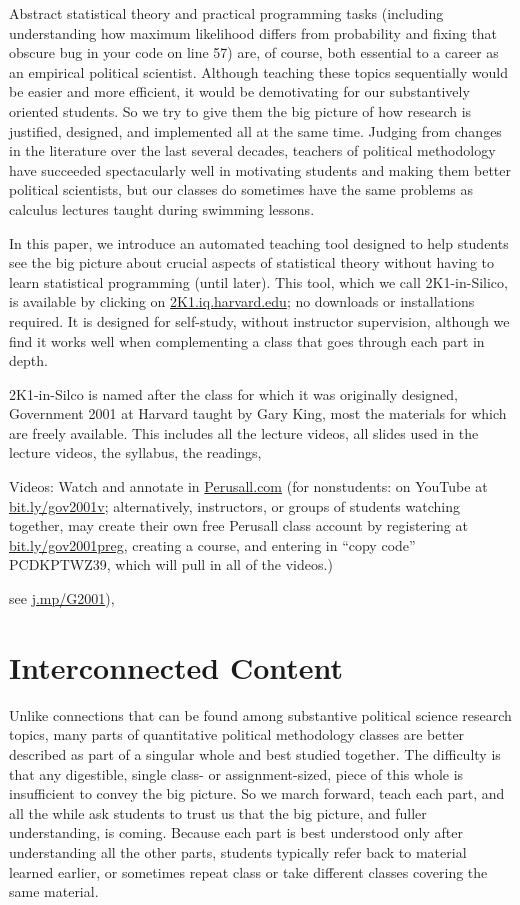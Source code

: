 \documentclass[12pt]{article}
\theoremstyle{definition}
\begin{document}
Abstract statistical theory and practical programming tasks (including understanding how maximum likelihood differs from probability and fixing that obscure bug in your code on line 57) are, of course, both essential to a career as an empirical political scientist. Although teaching these topics sequentially would be easier and more efficient, it would be demotivating for our substantively oriented students. So we try to give them the big picture of how research is justified, designed, and implemented all at the same time. Judging from changes in the literature over the last several decades, teachers of political methodology have succeeded spectacularly well in motivating students and making them better political scientists, but our classes do sometimes have the same problems as calculus lectures taught during swimming lessons.

In this paper, we introduce an automated teaching tool designed to help students see the big picture about crucial aspects of statistical theory without having to learn statistical programming (until later).  This tool, which we call 2K1-in-Silico, is available by clicking on \href{https://2k1.iq.harvard.edu}{2K1.iq.harvard.edu}; no downloads or installations required.  It is designed for self-study, without instructor supervision, although we find it works well when complementing a class that goes through each part in depth.

2K1-in-Silco is named after the class for which it was originally designed, Government 2001 at Harvard taught by Gary King, most the materials for which are freely available. This includes all the lecture videos, all slides used in the lecture videos, the syllabus, the readings, 

Videos: Watch and annotate in \href{https://perusall.com}{Perusall.com} (for nonstudents: on YouTube at \href{https://bit.ly/gov2001v}{bit.ly/gov2001v}; alternatively, instructors, or groups of students watching together, may create their own free Perusall class account by registering at \href{https://bit.ly/gov2001preg}{bit.ly/gov2001preg}, creating a course, and entering in ``copy code'' PCDKPTWZ39, which will pull in all of the videos.)

see \href{https://j.mp/G2001}{j.mp/G2001}), 


\section{Interconnected Content}

Unlike connections that can be found among substantive political science research topics, many parts of quantitative political methodology classes are better described as part of a singular whole and best studied together. The difficulty is that any digestible, single class- or assignment-sized, piece of this whole is insufficient to convey the big picture. So we march forward, teach each part, and all the while ask students to trust us that the big picture, and fuller understanding, is coming. Because each part is best understood only after understanding all the other parts, students typically refer back to material learned earlier, or sometimes repeat class or take different classes covering the same material. 
\end{document}
